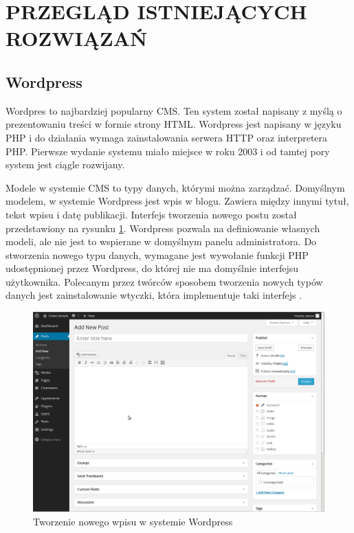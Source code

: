 \section{PRZEGLĄD ISTNIEJĄCYCH ROZWIĄZAŃ}

\subsection{Wordpress}

Wordpres to najbardziej popularny CMS. Ten system został napisany z myślą o
prezentowaniu treści w formie strony HTML. Wordpress jest napisany w języku PHP
i do działania wymaga zainstalowania serwera HTTP oraz interpretera PHP.
Pierwsze wydanie systemu miało miejsce w roku 2003 i od tamtej pory system jest
ciągle rozwijany.

Modele w systemie CMS to typy danych, którymi można zarządzać. Domyślnym
modelem, w systemie Wordpress jest wpis w blogu. Zawiera między innymi tytuł,
tekst wpisu i datę publikacji. Interfejs tworzenia nowego postu został
przedstawiony na rysunku \ref{wordpressNewPost}. Wordpress pozwala na
definiowanie własnych modeli, ale nie jest to wspierane w domyślnym panelu
administratora. Do stworzenia nowego typu danych, wymagane jest wywołanie
funkcji PHP udostępnionej przez Wordpress, do której nie ma domyślnie interfejsu
użytkownika. Polecanym przez twórców sposobem tworzenia nowych typów danych jest
zainstalowanie wtyczki, która implementuje taki interfejs
\cite{WordpressCustomType}.

\begin{figure}[h]
    \centering
    \includegraphics[width=1\textwidth]{./img/wordpress_new_post.png}
    \caption{Tworzenie nowego wpisu w systemie Wordpress}
    \label{wordpressNewPost}
\end{figure}

